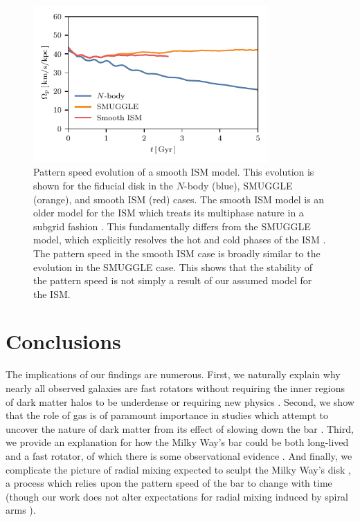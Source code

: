 \documentclass[fleqn,usenatbib]{mnras}
\newcommand{\Nbody}{$N$-body}
\begin{document}
\begin{figure}
    \centering
    \includegraphics[width=9cm]{fig/ps_GFM.pdf}
    \caption{Pattern speed evolution of a smooth ISM model. This evolution is
    shown for the fiducial disk in the \Nbody{} (blue), SMUGGLE (orange), and
    smooth ISM (red) cases. The smooth ISM model is an older model for the ISM
    which treats its multiphase nature in a subgrid fashion
    \citep{2003MNRAS.339..289S}. This fundamentally differs from the SMUGGLE
    model, which explicitly resolves the hot and cold phases of the ISM
    \citep{2019MNRAS.489.4233M}. The pattern speed in the smooth ISM case is
    broadly similar to the evolution in the SMUGGLE case. This shows that the
    stability of the pattern speed is not simply a result of our assumed model
    for the ISM.}
\label{fig:GFM}
\end{figure}

\section{Conclusions}
\label{sec:conclusions}
The implications of our findings are numerous. First, we naturally explain why
nearly all observed galaxies are fast rotators without requiring the inner
regions of dark matter halos to be underdense \citep{1998ApJ...493L...5D,
2000ApJ...543..704D} or requiring new physics \citep{2021MNRAS.503.2833R,
2021MNRAS.508..926R}. Second, we show that the role of gas is of paramount
importance in studies which attempt to uncover the nature of dark matter from
its effect of slowing down the bar \citep{2021MNRAS.500.4710C,
2021MNRAS.505.2412C}. Third, we provide an explanation for how the Milky Way's
bar could be both long-lived and a fast rotator, of which there is some
observational evidence \citep{2019MNRAS.490.4740B}. And finally, we complicate
the picture of radial mixing expected to sculpt the Milky Way's disk
\citep{2012MNRAS.420..913B, 2015ApJ...808..132H}, a process which relies upon
the pattern speed of the bar to change with time (though our work does not
alter expectations for radial mixing induced by spiral
arms \citep{2002MNRAS.336..785S}).
\end{document}
